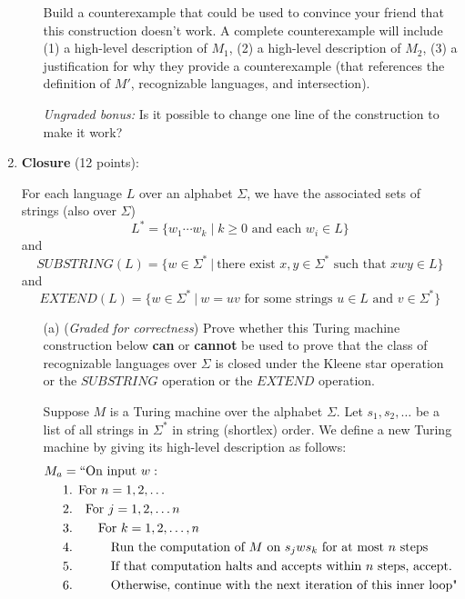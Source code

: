 \documentclass[12pt, oneside]{article}
\newcommand{\gradeCorrect}{({\it Graded for correctness}) }
\begin{document}
\begin{enumerate}[wide, labelwidth=!, labelindent=0pt]
\begin{enumerate}
 Build a counterexample that could be used to convince your friend that this 
 construction doesn't work. A complete counterexample will include (1) a high-level description of $M_1$, (2) a high-level description of $M_2$, (3) a justification for why they provide a counterexample (that references the definition of $M'$, recognizable languages, and intersection).


 {\it Ungraded bonus:} Is it possible to change one line of the construction to make it work?
\end{enumerate}

\item\textbf{Closure} (12 points):

For each language $L$ over an alphabet $\Sigma$, we have the 
associated sets of strings (also over $\Sigma$)
\[
    L^* = \{ w_1 \cdots w_k \mid k \geq 0 \textrm{ and each } w_i \in L\}
\]
and
\[
    SUBSTRING(L) = \{ w \in \Sigma^* ~|~ \text{there exist } x,y \in \Sigma^* \text{ such that } xwy \in L\}
\]
and 
\[
    EXTEND(L) = \{ w \in \Sigma^* ~|~ w = uv \text{ for some strings } u \in L \text{ and } v \in \Sigma^* \}
\]

\begin{enumerate}
\item[(a)]\gradeCorrect Prove whether this Turing machine construction below 
{\bf can} or {\bf cannot} be used to prove that the
class of recognizable languages over $\Sigma$ is closed under the 
Kleene star operation or the $SUBSTRING$ operation or the $EXTEND$ operation.

Suppose $M$ is a Turing machine over the alphabet $\Sigma$. 
Let $s_1, s_2, \ldots$ be a list of all strings in 
$\Sigma^*$ in string (shortlex) order.
We define a new Turing machine
by giving its high-level description as follows: 
\begin{align*}
   M_{a} &= ``\text{On input }w:\\
    &\text{1. For $n = 1, 2, \ldots$}\\
    &\text{2.~~~For $j = 1, 2, \ldots n$} \\
    &\text{3.~~~~~~For $k = 1, 2, \ldots, n$} \\
    &\text{4.~~~~~~~~~Run the computation of $M$ on $s_jws_k$ for at most $n$ steps}\\
    &\text{5.~~~~~~~~~If that computation halts and accepts within $n$ steps, accept.}\\
    &\text{6.~~~~~~~~~Otherwise, continue with the next iteration of this inner loop"}\\
\end{align*}


\end{enumerate}
\end{enumerate}
\end{document}
